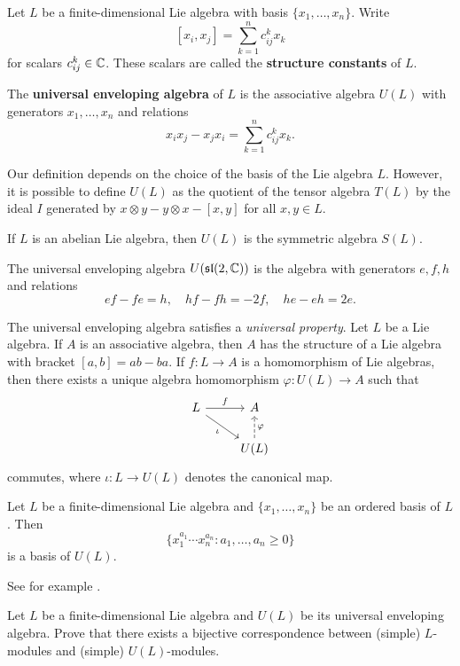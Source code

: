 
Let $L$ be a finite-dimensional Lie algebra with
basis $\{x_1,\dots,x_n\}$. Write
\[
[x_i,x_j]=\sum_{k=1}^n c^k_{ij}x_k
\]
for scalars $c_{ij}^k\in\mathbb{C}$. 
These scalars are called 
the \textbf{structure constants} of $L$. 

The \textbf{universal enveloping algebra} of $L$ 
is the associative algebra $U(L)$ with generators 
$x_1,\dots,x_n$ and relations 
\[
x_ix_j-x_jx_i=\sum_{k=1}^n c_{ij}^kx_k.
\]

Our definition depends on the choice of the basis of the Lie algebra $L$. 
However, it is possible to define $U(L)$ as the quotient 
of the tensor algebra $T(L)$ by the ideal $I$ 
generated by $x\otimes y-y\otimes x-[x,y]$ for all $x,y\in L$.  

\begin{example}
    If $L$ is an abelian Lie algebra, then $U(L)$ is 
    the symmetric algebra $S(L)$. 
\end{example}

\begin{example}
    The universal enveloping algebra $U(\mathfrak{sl}(2,\mathbb{C}))$ 
    is the algebra with generators $e,f,h$ and relations 
    \[
    ef-fe=h,\quad
    hf-fh=-2f,\quad
    he-eh=2e.
    \]
\end{example}


The universal enveloping algebra satisfies a \emph{universal property}. 
Let $L$ be a Lie algebra. If $A$ is an associative algebra, then
$A$ has the structure of a Lie algebra with
bracket 
$[a,b]=ab-ba$. If $f\colon L\to A$ is a homomorphism of Lie algebras, 
then there exists a unique algebra homomorphism
$\varphi\colon U(L)\to A$ such that 
\[
\begin{tikzcd}
	L & A \\
	& U(L)
	\arrow["f", from=1-1, to=1-2]
	\arrow["{\iota }"', from=1-1, to=2-2]
	\arrow["\varphi"', dashed, from=2-2, to=1-2]
\end{tikzcd}
\]
commutes, where $\iota\colon L\to U(L)$ 
denotes the canonical map. 


\begin{theorem}
    Let $L$ be a finite-dimensional Lie algebra and 
    $\{x_1,\dots,x_n\}$ be an ordered basis of $L$. Then 
    \[
    \{x_1^{a_1}\cdots x_n^{a_n}:a_1,\dots,a_n\geq0\}
    \]
    is a basis of $U(L)$. 
\end{theorem}

See for example \cite[\S17.4]{MR499562}. 

\begin{exercise}
    Let $L$ be a finite-dimensional Lie algebra and $U(L)$ be its
    universal enveloping algebra. Prove that there exists a bijective
    correspondence between (simple) $L$-modules and (simple) $U(L)$-modules. 
\end{exercise}
